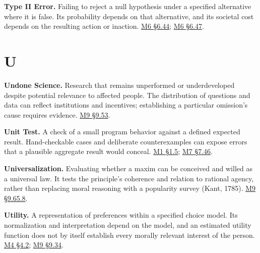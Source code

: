 \noindent\textbf{Type II Error.} Failing to reject a null hypothesis under a
specified alternative where it is false. Its probability depends on that
alternative, and its societal cost depends on the resulting action or
inaction.
\href{Marketing_Analytics_Lecture_Notes.pdf\#M06-type-i-and-type-ii-errors-under-unequal-costs}{M6
§6.44};
\href{Marketing_Analytics_Lecture_Notes.pdf\#M06-choosing-the-null-for-a-claim-about-harm}{M6
§6.47}.

\par{}
\hypertarget{module-u}{%
\section*{U}\label{module-u}}

\noindent\textbf{Undone Science.} Research that remains unperformed or
underdeveloped despite potential relevance to affected people. The
distribution of questions and data can reflect institutions and
incentives; establishing a particular omission's cause requires
evidence.
\hyperref[M09-undone-science-and-the-distribution-of-evidence]{M9
§9.53}.

\noindent\textbf{Unit Test.} A check of a small program behavior against a
defined expected result. Hand-checkable cases and deliberate
counterexamples can expose errors that a plausible aggregate result
would conceal.
\href{Marketing_Analytics_Lecture_Notes.pdf\#M01-ai-assisted-coding-as-a-sequence-of-verifiable-steps}{M1
§1.5};
\href{Marketing_Analytics_Lecture_Notes.pdf\#M07-evaluate-a-checker-with-deliberately-incorrect-programs}{M7
§7.46}.

\noindent\textbf{Universalization.} Evaluating whether a maxim can be conceived
and willed as a universal law. It tests the principle's coherence and
relation to rational agency, rather than replacing moral reasoning with
a popularity survey (Kant, 1785).
\hyperref[M09-maxims-of-data-production-and-disclosure]{M9
§9.65.8}.

\noindent\textbf{Utility.} A representation of preferences within a specified
choice model. Its normalization and interpretation depend on the model,
and an estimated utility function does not by itself establish every
morally relevant interest of the person.
\href{Marketing_Analytics_Lecture_Notes.pdf\#M04-utility-choice-probabilities-and-willingness-to-pay}{M4
§4.2};
\hyperref[M09-a-customer-type-and-a-persons-reasons]{M9
§9.34}.


